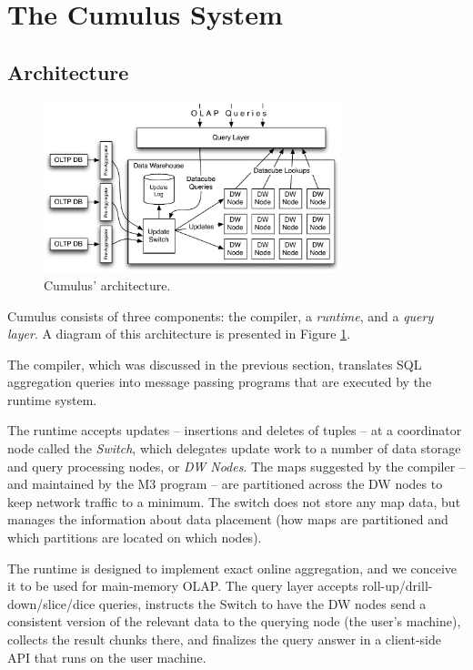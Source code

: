 

\section{The Cumulus System}
\label{sec:architecture}


\subsection{Architecture}


\begin{figure}
\hspace{-3mm}
\includegraphics[width=3.4in]{images/Architecture.pdf}

\vspace{-4mm}

\caption{Cumulus' architecture.}
\label{fig:arch}
\end{figure}


Cumulus consists of three components: the compiler,
a {\em runtime}, and a {\em query layer}.
A diagram of this architecture is presented in Figure \ref{fig:arch}.

The compiler, which was discussed in the
previous section, translates SQL aggregation queries
into message passing programs that are executed by the runtime system.

The runtime accepts updates -- insertions and deletes of tuples --
at a coordinator node called the \textit{Switch}, which delegates
update work to a number of data storage and query processing nodes, or
\textit{DW Nodes}.
The maps suggested by the compiler -- and maintained by the M3 program --
are partitioned across the DW nodes to keep network traffic to a minimum.  
The switch does not store any map data, but manages
the information about data placement (how maps are partitioned and which
partitions are located on which nodes).

The runtime is designed to implement exact online aggregation, and
we conceive it to be used for main-memory OLAP.
The query layer accepts roll-up/drill-down/slice/dice queries,
instructs the Switch to have the DW nodes send a consistent version of
the relevant data to the querying node (the user's machine),
collects the result chunks there, and
finalizes the query answer
in a client-side API that runs on the user machine.

